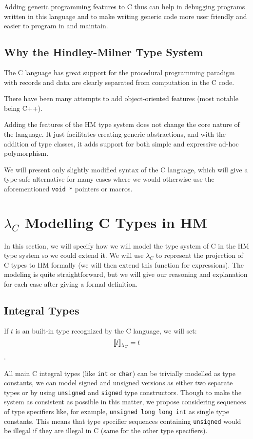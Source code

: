 Adding generic programming features to C thus can help in debugging programs written in this language and to make writing generic code more user friendly and easier to program in and maintain.

\subsection{Why the Hindley-Milner Type System}

The C language has great support for the procedural programming paradigm with records and data are clearly separated from computation in the C code.

There have been many attempts to add object-oriented features (most notable being C++).

Adding the features of the HM type system does not change the core nature of the language. It just facilitates creating generic abstractions, and with the addition of type classes, it adds support for both simple and expressive ad-hoc polymorphism.

We will present only slightly modified syntax of the C language, which will give a type-safe alternative for many cases where we would otherwise use the aforementioned \lstinline{void *} pointers or macros.

\section{$\lambda_C$ Modelling C Types in HM}

In this section, we will specify how we will model the type system of C in the HM type system so we could extend it. We will use $\lambda_C$ to represent the projection of C types to HM formally (we will then extend this function for expressions). The modeling is quite straightforward, but we will give our reasoning and explanation for each case after giving a formal definition.

\subsection{Integral Types}

\begin{defn}
    If $t$ is an built-in type recognized by the C language, we will set: $${\llbracket t \rrbracket}_{\lambda_C} = t$$.
\end{defn}

All main C integral types (like \lstinline{int} or \lstinline{char}) can be trivially modelled as type constants, we can model signed and unsigned versions as either two separate types or by using \lstinline{unsigned} and \lstinline{signed} type constructors. Though to make the system as consistent as possible in this matter, we propose considering sequences of type specifiers like, for example, \lstinline{unsigned long long int} as single type constants. This means that type specifier sequences containing \lstinline{unsigned} would be illegal if they are illegal in C (same for the other type specifiers).

